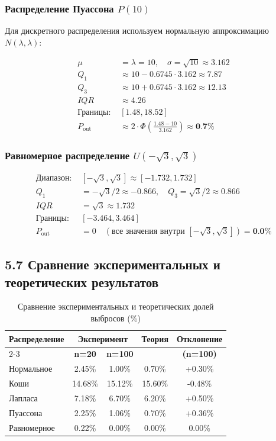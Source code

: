 \documentclass[a4paper,14pt]{extarticle}
\begin{document}
\subsubsection*{Распределение Пуассона $P(10)$}

Для дискретного распределения используем нормальную аппроксимацию $N(\lambda, \lambda)$:

\begin{align*}
\mu &= \lambda = 10, \quad \sigma = \sqrt{10} \approx 3.162 \\
Q_1 &\approx 10 - 0.6745 \cdot 3.162 \approx 7.87 \\
Q_3 &\approx 10 + 0.6745 \cdot 3.162 \approx 12.13 \\
IQR &\approx 4.26 \\
\text{Границы: } & [1.48, 18.52] \\
P_{\text{out}} &\approx 2 \cdot \Phi\left(\frac{1.48 - 10}{3.162}\right) \approx \textbf{0.7\%}
\end{align*}

\subsubsection*{Равномерное распределение $U(-\sqrt{3}, \sqrt{3})$}

\begin{align*}
\text{Диапазон: } & [-\sqrt{3}, \sqrt{3}] \approx [-1.732, 1.732] \\
Q_1 &= -\sqrt{3}/2 \approx -0.866, \quad Q_3 = \sqrt{3}/2 \approx 0.866 \\
IQR &= \sqrt{3} \approx 1.732 \\
\text{Границы: } & [-3.464, 3.464] \\
P_{\text{out}} &= 0 \quad (\text{все значения внутри } [-\sqrt{3}, \sqrt{3}]) = \textbf{0.0\%}
\end{align*}

\subsection*{5.7 Сравнение экспериментальных и теоретических результатов}

\begin{table}[H]
\centering
\caption{Сравнение экспериментальных и теоретических долей выбросов (\%)}
\begin{tabular}{|l|c|c|c|c|}
\hline
\textbf{Распределение} & \multicolumn{2}{c|}{\textbf{Эксперимент}} & \textbf{Теория} & \textbf{Отклонение} \\
\cline{2-3}
& \textbf{n=20} & \textbf{n=100} & & \textbf{(n=100)} \\
\hline
Нормальное & 2.45\% & 1.00\% & 0.70\% & +0.30\% \\
Коши & 14.68\% & 15.12\% & 15.60\% & -0.48\% \\
Лапласа & 7.18\% & 6.70\% & 6.20\% & +0.50\% \\
Пуассона & 2.25\% & 1.06\% & 0.70\% & +0.36\% \\
Равномерное & 0.22\% & 0.00\% & 0.00\% & 0.00\% \\
\hline
\end{tabular}
\end{table}
\end{document}
